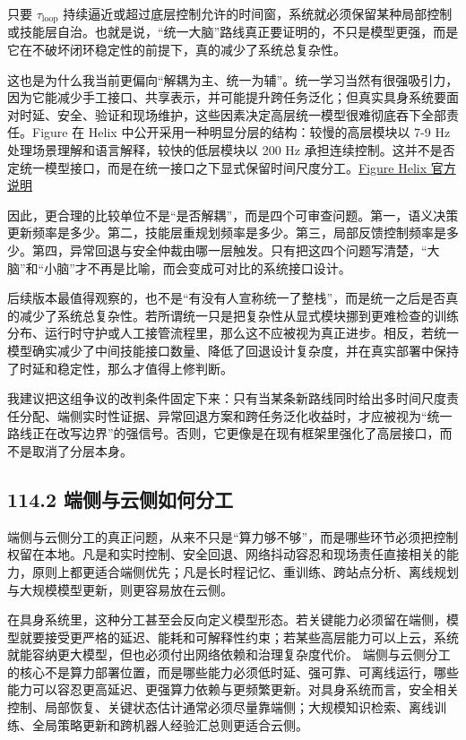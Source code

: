 只要 \(\tau_{\text{loop}}\) 持续逼近或超过底层控制允许的时间窗，系统就必须保留某种局部控制或技能层自治。也就是说，“统一大脑”路线真正要证明的，不只是模型更强，而是它在不破坏闭环稳定性的前提下，真的减少了系统总复杂性。

这也是为什么我当前更偏向“解耦为主、统一为辅”。统一学习当然有很强吸引力，因为它能减少手工接口、共享表示，并可能提升跨任务泛化；但真实具身系统要面对时延、安全、验证和现场维护，这些因素决定高层统一模型很难彻底吞下全部责任。Figure 在 Helix 中公开采用一种明显分层的结构：较慢的高层模块以 7-9 Hz 处理场景理解和语言解释，较快的低层模块以 200 Hz 承担连续控制。这并不是否定统一模型接口，而是在统一接口之下显式保留时间尺度分工。\href{https://www.figure.ai/news/helix}{Figure Helix 官方说明}

因此，更合理的比较单位不是“是否解耦”，而是四个可审查问题。第一，语义决策更新频率是多少。第二，技能层重规划频率是多少。第三，局部反馈控制频率是多少。第四，异常回退与安全仲裁由哪一层触发。只有把这四个问题写清楚，“大脑”和“小脑”才不再是比喻，而会变成可对比的系统接口设计。

后续版本最值得观察的，也不是“有没有人宣称统一了整栈”，而是统一之后是否真的减少了系统总复杂性。若所谓统一只是把复杂性从显式模块挪到更难检查的训练分布、运行时守护或人工接管流程里，那么这不应被视为真正进步。相反，若统一模型确实减少了中间技能接口数量、降低了回退设计复杂度，并在真实部署中保持了时延和稳定性，那么才值得上修判断。

我建议把这组争议的改判条件固定下来：只有当某条新路线同时给出多时间尺度责任分配、端侧实时性证据、异常回退方案和跨任务泛化收益时，才应被视为“统一路线正在改写边界”的强信号。否则，它更像是在现有框架里强化了高层接口，而不是取消了分层本身。

\subsection*{114.2 端侧与云侧如何分工}


端侧与云侧分工的真正问题，从来不只是“算力够不够”，而是哪些环节必须把控制权留在本地。凡是和实时控制、安全回退、网络抖动容忍和现场责任直接相关的能力，原则上都更适合端侧优先；凡是长时程记忆、重训练、跨站点分析、离线规划与大规模模型更新，则更容易放在云侧。

在具身系统里，这种分工甚至会反向定义模型形态。若关键能力必须留在端侧，模型就要接受更严格的延迟、能耗和可解释性约束；若某些高层能力可以上云，系统就能容纳更大模型，但也必须付出网络依赖和治理复杂度代价。 端侧与云侧分工的核心不是算力部署位置，而是哪些能力必须低时延、强可靠、可离线运行，哪些能力可以容忍更高延迟、更强算力依赖与更频繁更新。对具身系统而言，安全相关控制、局部恢复、关键状态估计通常必须尽量靠端侧；大规模知识检索、离线训练、全局策略更新和跨机器人经验汇总则更适合云侧。

